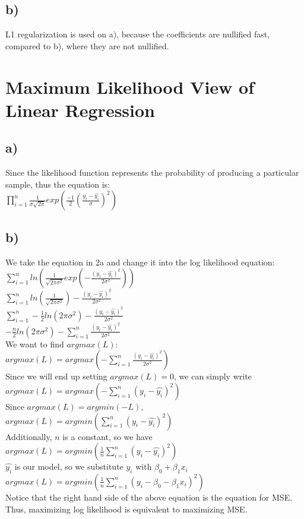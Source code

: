 \documentclass[12pt, letterpaper]{article}
\begin{document}
\subsection*{b)} L1 regularization is used on a), because the coefficients are nullified fast, compared to b), where they are not nullified.

\newpage
\section{Maximum Likelihood View of Linear Regression}
\subsection*{a)} Since the likelihood function represents the probability of producing a particular sample, thus the equation is:\\
$\prod_{i=1}^{n}\frac{1}{\sigma\sqrt{2\pi}}exp(\frac{-1}{2}(\frac{y_i-\hat{y_i}}{\sigma})^2)$\\

\subsection*{b)} We take the equation in 2a and change it into the log likelihood equation:\\
$\sum_{i=1}^{n}ln(\frac{1}{\sqrt{2\pi\sigma^2}}exp(-\frac{(y_i - \hat{y_i})^2}{2\sigma^2}))$\\
$\sum_{i=1}^{n}ln(\frac{1}{\sqrt{2\pi\sigma^2}}) -\frac{(y_i - \hat{y_i})^2}{2\sigma^2}$\\
$\sum_{i=1}^{n}-\frac{1}{2}ln(2\pi\sigma^2) -\frac{(y_i - \hat{y_i})^2}{2\sigma^2}$\\
$-\frac{n}{2}ln(2\pi\sigma^2) -\sum_{i=1}^{n}\frac{(y_i - \hat{y_i})^2}{2\sigma^2}$\\

We want to find $argmax(L)$:\\
$argmax(L) = argmax(-\sum_{i=1}^{n}\frac{(y_i - \hat{y_i})^2}{2\sigma^2})$\\
Since we will end up setting $argmax(L) = 0$, we can simply write\\
$argmax(L) = argmax(-\sum_{i=1}^{n}(y_i - \hat{y_i})^2)$\\
Since $argmax(L) = argmin(-L)$, \\
$argmax(L) = argmin(\sum_{i=1}^{n}(y_i - \hat{y_i})^2)$\\
Additionally, $n$ is a constant, so we have\\
$argmax(L) = argmin(\frac{1}{n}\sum_{i=1}^{n}(y_i - \hat{y_i})^2)$\\
$\hat{y_i}$ is our model, so we substitute $\hat{y_i}$ with $\beta_0 + \beta_1x_i$\\
$argmax(L) = argmin(\frac{1}{n}\sum_{i=1}^{n}(y_i - \beta_0 - \beta_1x_i)^2)$\\
Notice that the right hand side of the above equation is the equation for MSE. Thus, maximizing log likelihood is equivalent to maximizing MSE.
\end{document}
